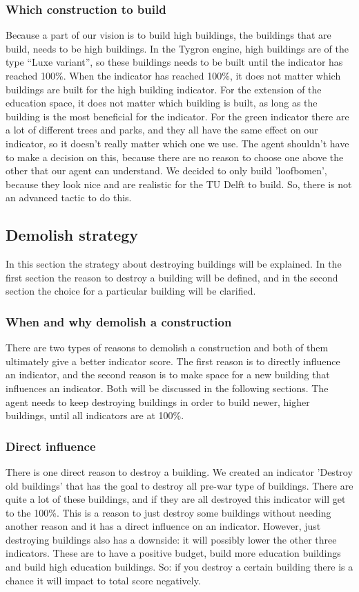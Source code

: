 \subsubsection{Which construction to build}
Because a part of our vision is to build high buildings, the buildings that are build, needs to be high buildings. In the Tygron engine, high buildings are of the type “Luxe variant”, so these buildings needs to be built until the indicator has reached 100\%. When the indicator has reached 100\%, it does not matter which buildings are built for the high building indicator. For the extension of the education space, it does not matter which building is built, as long as the building is the most beneficial for the indicator.
For the green indicator there are a lot of different trees and parks, and they all have the same effect on our indicator, so it doesn't really matter which one we use. The agent shouldn't have to make a decision on this, because there are no reason to choose one above the other that our agent can understand. We decided to only build 'loofbomen', because they look nice and are realistic for the TU Delft to build. So, there is not an advanced tactic to do this.


\subsection{Demolish strategy}
In this section the strategy about destroying buildings will be explained. In the first section the reason to destroy a building will be defined, and in the second section the choice for a particular building will be clarified. 

\subsubsection{When and why demolish a construction}
There are two types of reasons to demolish a construction and both of them ultimately give a better indicator score. The first reason is to directly influence an indicator, and the second reason is to make space for a new building that influences an indicator. Both will be discussed in the following sections. The agent needs to keep destroying buildings in order to build newer, higher buildings, until all indicators are at 100\%.

\subsubsection{Direct influence}
There is one direct reason to destroy a building. We created an indicator 'Destroy old buildings' that has the goal to destroy all pre-war type of buildings. There are quite a lot of these buildings, and if they are all destroyed this indicator will get to the 100\%. This is a reason to just destroy some buildings without needing another reason and it has a direct influence on an indicator. However, just destroying buildings also has a downside: it will possibly lower the other three indicators. These are to have a positive budget, build more education buildings and build high education buildings. So: if you destroy a certain building there is a chance it will impact to total score negatively. 

